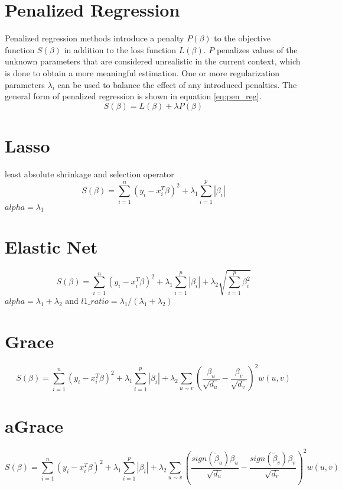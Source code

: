 \section{Penalized Regression}
Penalized regression methods introduce a penalty $P(\beta)$ to the objective function $S(\beta)$ in addition to the loss function $L(\beta)$. $P$ penalizes values of the unknown parameters that are considered unrealistic in the current context, which is done to obtain a more meaningful estimation. One or more regularization parameters $\lambda_i$ can be used to balance the effect of any introduced penalties. The general form of penalized regression is shown in equation \ref{eq:pen_reg}. 
\begin{equation} \label{eq:pen_reg}
S(\beta) = L(\beta) + \lambda P(\beta)
\end{equation}


\section{Lasso}
least absolute shrinkage and selection operator
\begin{equation}
S(\beta) = \sum_{i=1}^{n} (y_i - x_i^T\beta)^2 + \lambda_1\sum_{i=1}^{p}\left|\beta_i\right|
\end{equation}
$alpha = \lambda_1$


\section{Elastic Net}
\begin{equation}
S(\beta) = \sum_{i=1}^{n} (y_i - x_i^T\beta)^2 + \lambda_1\sum_{i=1}^{p}\left|\beta_i\right| + \lambda_2\sqrt{\sum_{i=1}^{p}\beta_i^2}
\end{equation}
$alpha = \lambda_1 + \lambda_2$ and $l1\_ratio = \lambda_1/(\lambda_1+\lambda_2)$


\section{Grace}
\begin{equation}
S(\beta) = \sum_{i=1}^{n} (y_i - x_i^T\beta)^2 + \lambda_1\sum_{i=1}^{p}\left|\beta_i\right| + \lambda_2\sum_{u \sim v}\left(\frac{\beta_u}{\sqrt{d_u}}-\frac{\beta_v}{\sqrt{d_v}}\right)^2w(u,v)
\end{equation}


\section{aGrace}
\begin{equation}
S(\beta) = \sum_{i=1}^{n} (y_i - x_i^T\beta)^2 + \lambda_1\sum_{i=1}^{p}\left|\beta_i\right| + \lambda_2\sum_{u \sim v}\left(\frac{sign(\tilde{\beta}_u)\beta_u}{\sqrt{d_u}}-\frac{sign(\tilde{\beta}_v)\beta_v}{\sqrt{d_v}}\right)^2w(u,v)
\end{equation}


